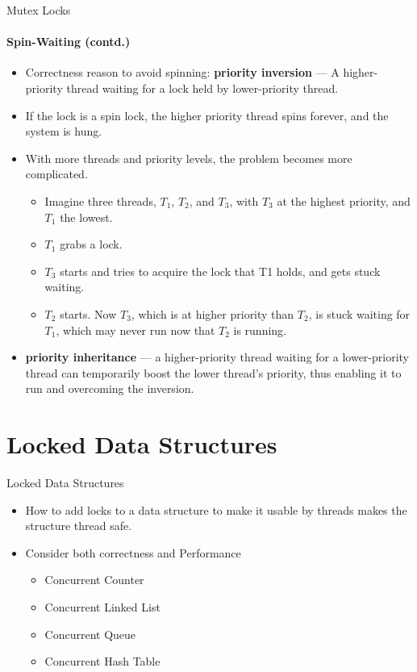 \documentclass[10pt]{beamer}
\begin{document}
\begin{frame}{Mutex Locks}
\framesubtitle{Spin-Waiting (contd.)}
\begin{itemize}
 
\item Correctness reason to avoid spinning: \textbf{\alert{priority inversion}} --- A higher-priority thread waiting for a lock held by lower-priority thread.
\item If the lock is a spin lock, the higher priority thread spins forever, and the system is hung.
\item With more threads and priority levels, the problem becomes more complicated.
\begin{itemize}
\scriptsize
\item Imagine three threads, $T_1$, $T_2$, and $T_3$, with $T_3$ at the highest priority, and $T_1$ the lowest. 
\item $T_1$ grabs a lock. 
\item $T_3$ starts and tries to acquire the lock that T1 holds, and gets stuck waiting.
\item $T_2$ starts. Now $T_3$, which is at higher priority than $T_2$, is stuck waiting for $T_1$, which may never run now that $T_2$ is running. 
\end{itemize}
\item \textbf{\alert{priority inheritance}} --- a higher-priority thread waiting for a lower-priority thread can temporarily boost the lower thread's priority, thus enabling it to run and overcoming the inversion.
\end{itemize}
\end{frame}

\section[5.Locked Data Struc.]{Locked Data Structures}
\begin{frame}{Locked Data Structures}
\begin{itemize}
\item How to add locks to a data structure to make it usable by threads makes the structure thread safe.
\item Consider both correctness and Performance
\begin{itemize}
\item Concurrent Counter
\item Concurrent Linked List
\item Concurrent Queue
\item Concurrent Hash Table
\end{itemize}
\end{itemize}
\end{frame}
\end{document}

